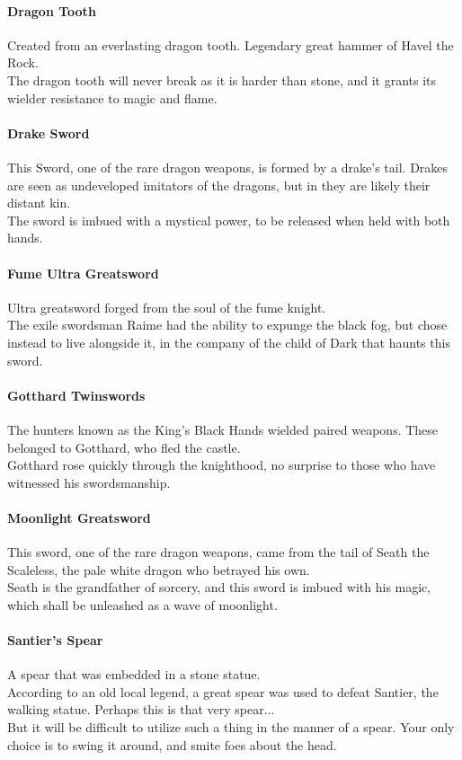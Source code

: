 \documentclass[twocolumn,a4paper]{article}
\begin{document}
\paragraph{Dragon Tooth}
Created from an everlasting dragon tooth. Legendary great hammer of Havel the Rock.\\
The dragon tooth will never break as it is harder than stone, and it grants its wielder resistance to magic and flame.
\paragraph{Drake Sword}
This Sword, one of the rare dragon weapons, is formed by a drake's tail. Drakes are seen as undeveloped imitators of the dragons, but in they are likely their distant kin.\\
The sword is imbued with a mystical power, to be released when held with both hands.
\paragraph{Fume Ultra Greatsword}
Ultra greatsword forged from the soul of the fume knight.\\
The exile swordsman Raime had the ability to expunge the black fog, but chose instead to live alongside it, in the company of the child of Dark that haunts this sword.
\paragraph{Gotthard Twinswords}
The hunters known as the King's Black Hands wielded paired weapons. These belonged to Gotthard, who fled the castle.\\
Gotthard rose quickly through the knighthood, no surprise to those who have witnessed his swordsmanship.
\paragraph{Moonlight Greatsword}
This sword, one of the rare dragon weapons, came from the tail of Seath the Scaleless, the pale white dragon who betrayed his own.\\
Seath is the grandfather of sorcery, and this sword is imbued with his magic, which shall be unleashed as a wave of moonlight.
\paragraph{Santier's Spear}
A spear that was embedded in a stone statue.\\
According to an old local legend, a great spear was used to defeat Santier, the walking statue. Perhaps this is that very spear...\\
But it will be difficult to utilize such a thing in the manner of a spear. Your only choice is to swing it around, and smite foes about the head.
\end{document}
